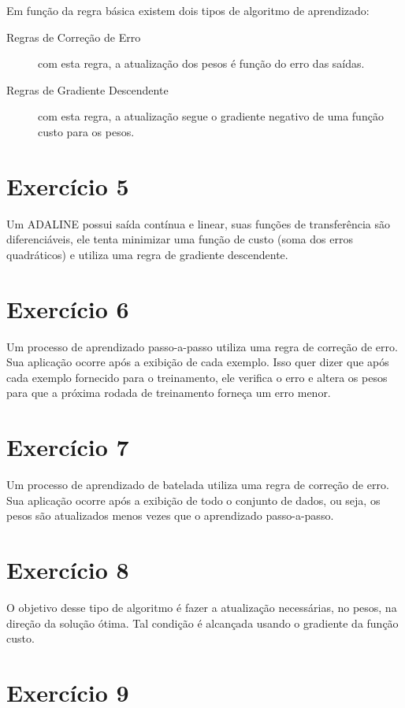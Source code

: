 \documentclass[a4]{article}
\begin{document}
\begin{flushleft}
Em função da regra básica existem dois tipos de algoritmo de aprendizado:

\begin{description}
	\item[Regras de Correção de Erro] com esta regra, a atualização dos pesos é função do erro das saídas.
	\item[Regras de Gradiente Descendente] com esta regra, a atualização segue o gradiente negativo de uma função custo para os pesos.
\end{description}

\section*{Exercício 5}

Um ADALINE possui saída contínua e linear, suas funções de transferência são diferenciáveis, ele tenta minimizar uma função de custo (soma dos erros quadráticos) e utiliza uma regra de gradiente descendente. 
 
\section*{Exercício 6}

Um processo de aprendizado passo-a-passo utiliza uma regra de correção de erro. Sua aplicação ocorre após a exibição de cada exemplo. Isso quer dizer que após cada exemplo fornecido para o treinamento, ele verifica o erro e altera os pesos para que a próxima rodada de treinamento forneça um erro menor.

\section*{Exercício 7}

Um processo de aprendizado de batelada utiliza uma regra de correção de erro. Sua aplicação ocorre após a exibição de todo o conjunto de dados, ou seja, os pesos são atualizados menos vezes que o aprendizado passo-a-passo.

\section*{Exercício 8}

O objetivo desse tipo de algoritmo é fazer a atualização necessárias, no pesos, na direção da solução ótima. Tal condição é alcançada usando o gradiente da função custo.

\section*{Exercício 9}


\end{flushleft}
\end{document}
